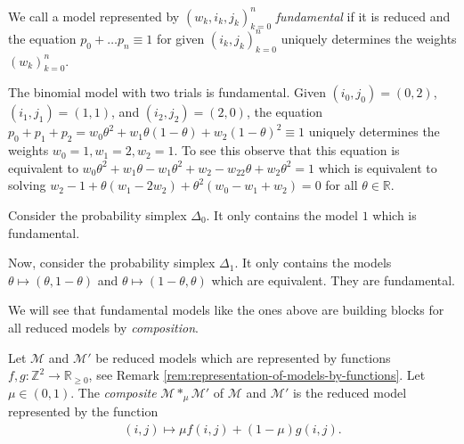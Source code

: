 \begin{definition}
    We call a model represented by \( (w_k, i_k, j_k)_{k=0}^n \) \emph{fundamental} if it is reduced and the equation \( p_0 + \dots p_n \equiv 1 \) for given \( (i_k, j_k)_{k=0}^n \) uniquely determines the weights \( (w_k)_{k=0}^n \).
\end{definition}

\begin{example}
    The binomial model with two trials is fundamental. Given \( (i_0, j_0) = (0,2) \), \( (i_1, j_1) = (1,1) \), and \( (i_2, j_2) = (2,0) \), the equation \( p_0 + p_1 + p_2 = w_0\theta^2 + w_1\theta(1-\theta) + w_2(1-\theta)^2 \equiv 1 \) uniquely determines the weights \( w_0 = 1, w_1 = 2, w_2 = 1 \). To see this observe that this equation is equivalent to \( w_0\theta^2 + w_1\theta - w_1 \theta^2 + w_2 -w_22\theta + w_2\theta^2 = 1\) which is equivalent to solving \( w_2 - 1 + \theta(w_1 - 2w_2) + \theta^2(w_0 - w_1 + w_2) = 0 \) for all \( \theta \in \mathbb{R} \).
\end{example}

\begin{example}\label{ex:prob-simplex-0}
    Consider the probability simplex \( \Delta_0 \). It only contains the model \( 1 \) which is fundamental.
\end{example}

\begin{example}\label{ex:prob-simplex-1}
    Now, consider the probability simplex \( \Delta_1 \). It only contains the models \( \theta \mapsto (\theta, 1-\theta) \) and \( \theta \mapsto (1-\theta, \theta) \) which are equivalent. They are fundamental.
\end{example}

We will see that fundamental models like the ones above are building blocks for all reduced models by \emph{composition}.

\begin{definition}
    Let \( \mathcal{M} \) and \( \mathcal{M}' \) be reduced models which are represented by functions \( f,g : \mathbb{Z}^2 \to \mathbb{R}_{\geq 0} \), see Remark \ref{rem:representation-of-models-by-functions}. Let \( \mu \in (0,1) \). The \emph{composite} \( \mathcal{M} *_\mu \mathcal{M}' \) of \( \mathcal{M} \) and \( \mathcal{M}' \) is the reduced model represented by the function 
    \begin{align*}
        (i,j) \mapsto \mu f(i,j) + (1-\mu) g(i,j).
    \end{align*}
\end{definition}


